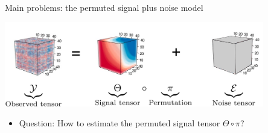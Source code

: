 \documentclass[aspectratio=169,xcolor=dvipsnames]{beamer}
\begin{document}
\begin{frame}{Main problems: the permuted signal plus noise model}
\begin{center}
    \includegraphics[width = 0.85\textwidth]{figure/spnm.pdf}
\end{center}
\begin{itemize}
    \item 
Question: How to estimate {\color{red}the permuted signal tensor} $\Theta\circ \pi$?
\end{itemize}


\begin{itemize}
\end{itemize}

\end{frame}
\end{document}
